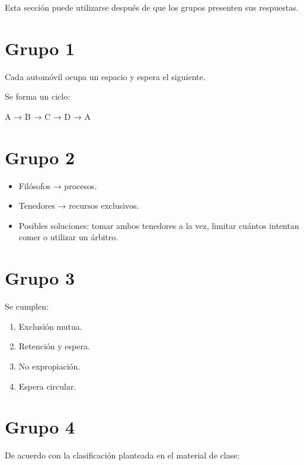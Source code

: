 \documentclass[
  spanish,
  letterpaper,
]{scrbook}
\newenvironment{Shaded}{\begin{snugshade}}{\end{snugshade}}
\newcommand{\NormalTok}[1]{\textcolor[rgb]{0.00,0.23,0.31}{#1}}
\providecommand{\tightlist}{%
  \setlength{\itemsep}{0pt}\setlength{\parskip}{0pt}}
\begin{document}
Esta sección puede utilizarse después de que los grupos presenten sus
respuestas.

\section{Grupo 1}\label{grupo-1}

Cada automóvil ocupa un espacio y espera el siguiente.

Se forma un ciclo:

\begin{Shaded}
\begin{Highlighting}[]
\NormalTok{A → B → C → D → A}
\end{Highlighting}
\end{Shaded}

\section{Grupo 2}\label{grupo-2}

\begin{itemize}
\tightlist
\item
  Filósofos → procesos.
\item
  Tenedores → recursos exclusivos.
\item
  Posibles soluciones: tomar ambos tenedores a la vez, limitar cuántos
  intentan comer o utilizar un árbitro.
\end{itemize}

\section{Grupo 3}\label{grupo-3}

Se cumplen:

\begin{enumerate}
\def\labelenumi{\arabic{enumi}.}
\tightlist
\item
  Exclusión mutua.
\item
  Retención y espera.
\item
  No expropiación.
\item
  Espera circular.
\end{enumerate}

\section{Grupo 4}\label{grupo-4}

De acuerdo con la clasificación planteada en el material de clase:
\end{document}
